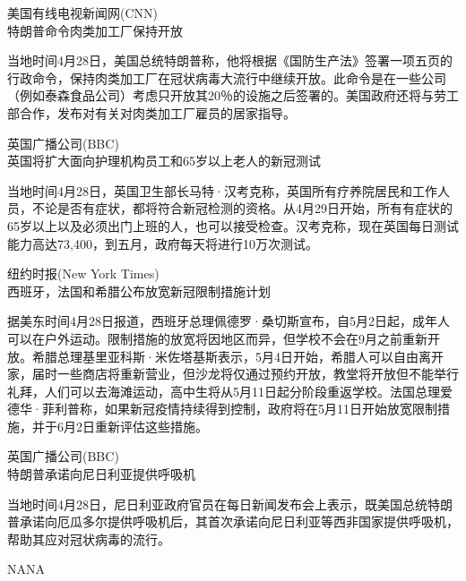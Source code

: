 \documentclass[
]{article}
\begin{document}
\begin{center}
\textcolor{glaucous}{美国有线电视新闻网(CNN)}\\特朗普命令肉类加工厂保持开放
\end{center}

当地时间4月28日，美国总统特朗普称，他将根据《国防生产法》签署一项五页的行政命令，保持肉类加工厂在冠状病毒大流行中继续开放。此命令是在一些公司（例如泰森食品公司）考虑只开放其20％的设施之后签署的。美国政府还将与劳工部合作，发布对有关对肉类加工厂雇员的居家指导。

\begin{center}
\textcolor{glaucous}{英国广播公司(BBC)}\\英国将扩大面向护理机构员工和65岁以上老人的新冠测试
\end{center}

当地时间4月28日，英国卫生部长马特·汉考克称，英国所有疗养院居民和工作人员，不论是否有症状，都将符合新冠检测的资格。从4月29日开始，所有有症状的65岁以上以及必须出门上班的人，也可以接受检查。汉考克称，现在英国每日测试能力高达73,400，到五月，政府每天将进行10万次测试。

\begin{center}
\textcolor{glaucous}{纽约时报(New York Times)}\\西班牙，法国和希腊公布放宽新冠限制措施计划

\end{center}

据美东时间4月28日报道，西班牙总理佩德罗·桑切斯宣布，自5月2日起，成年人可以在户外运动。限制措施的放宽将因地区而异，但学校不会在9月之前重新开放。希腊总理基里亚科斯·米佐塔基斯表示，5月4日开始，希腊人可以自由离开家，届时一些商店将重新营业，但沙龙将仅通过预约开放，教堂将开放但不能举行礼拜，人们可以去海滩运动，高中生将从5月11日起分阶段重返学校。法国总理爱德华·菲利普称，如果新冠疫情持续得到控制，政府将在5月11日开始放宽限制措施，并于6月2日重新评估这些措施。

\begin{center}
\textcolor{glaucous}{英国广播公司(BBC)}\\特朗普承诺向尼日利亚提供呼吸机

\end{center}

当地时间4月28日，尼日利亚政府官员在每日新闻发布会上表示，既美国总统特朗普承诺向厄瓜多尔提供呼吸机后，其首次承诺向尼日利亚等西非国家提供呼吸机，帮助其应对冠状病毒的流行。

\begin{center}
\textcolor{glaucous}{NA}NA
\end{center}
\end{document}
